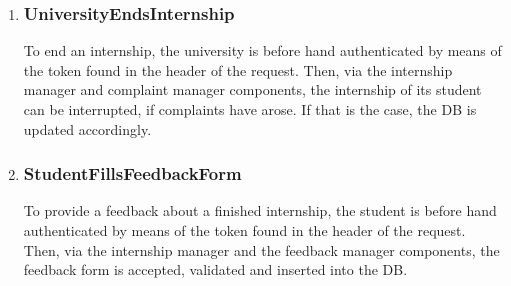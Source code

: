 \begin{enumerate}[label=\textbf{RV\arabic* -}]
\item \subsubsection{UniversityEndsInternship}

To end an internship, the university is before hand authenticated by means of the token found in the header of the request.
Then, via the internship manager and complaint manager components, the internship of its student can be interrupted, if complaints have arose.
If that is the case, the DB is updated accordingly.

\begin{figure}[H]
    \centering
\end{figure}

\item \subsubsection{StudentFillsFeedbackForm}

To provide a feedback about a finished internship, the student is before hand authenticated by means of the token found in the header of the request.
Then, via the internship manager and the feedback manager components, the feedback form is accepted, validated and inserted into the DB.

\begin{figure}[H]
    \centering
\end{figure}


\end{enumerate}

